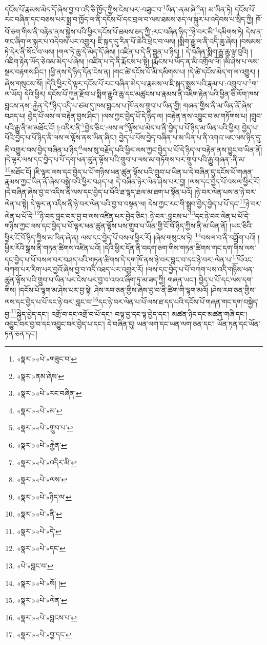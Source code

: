 དངོས་པོ་རྣམས་མེད་དོ་ཞེས་བྱ་བ་འདི་ཅི་ཁྱོད་ཀྱིས་ངེས་པར་:བཟུང་བ་\footnote{«སྣར་»«པེ་»གཟུང་བ་}ཡིན་:ནམ་ཞེ་\footnote{«སྣར་»ནམ་ཞེས་}ན། མ་ཡིན་ཏེ། དངོས་པོ་རང་བཞིན་དང་བཅས་པར་སྨྲ་བ་ཁྱོད་ལ་ནི་དངོས་པོ་དང་བྲལ་བ་ལས་ཐམས་ཅད་ལ་སྐུར་པ་འདེབས་པ་སྲིད་ཀྱི། ཁོ་བོ་ཅག་གིས་ནི་བརྟེན་ནས་སྐྱེས་པའི་ཕྱིར་དངོས་པོ་ཐམས་ཅད་ཀྱི་:རང་བཞིན་ཉིད་\footnote{«སྣར་»«པེ་»རང་བཞིན་}ཉེ་བར་མི་\footnote{«སྣར་»«པེ་»མ་}དམིགས་ཏེ། དེས་ན་གང་ཞིག་ལ་སྐུར་པ་འདེབས་པར་འགྱུར། ཇི་སྐད་དུ་རིན་པོ་ཆེའི་ཕྲེང་བ་ལས། །སྨིག་རྒྱུ་ལ་ནི་འདི་ཆུ་ཞེས། །བསམས་ཏེ་དེར་ནི་སོང་བ་ལས། །གལ་ཏེ་ཆུ་དེ་མེད་དོ་ཞེས། །འཛིན་པ་དེ་ནི་བླུན་པ་ཉིད། །
དེ་བཞིན་སྨིག་རྒྱུ་ཆུ་ལྟ་བུའི། །འཇིག་རྟེན་ཡོད་ཅེའམ་མེད་པ་ཞེས། །འཛིན་པ་དེ་ནི་རྨོངས་པ་སྟེ། །རྨོངས་པ་ཡོད་ན་མི་འགྲོལ་ལོ། །མི་ཤེས་པ་ལས་སྔར་བརྟགས་ཤིང་། །ཕྱི་ནས་དེ་ཉིད་དོན་ངེས་ན། །གང་ཚེ་དངོས་པོ་མི་དམིགས་པ། །དེ་ཚེ་དངོས་མེད་ག་ལ་འགྱུར། །ཞེས་གསུངས་སོ། །དེའི་ཕྱིར་དེ་ལྟར་དངོས་པོ་རང་བཞིན་མེད་པ་རྣམས་ལ་ཇི་སྐད་སྨྲས་པའི་རྣམ་པ་:འགྲུབ་པ་\footnote{«སྣར་»«པེ་»གྲུབ་པ་}ག་ལ་ཡོད། དེའི་ཕྱིར། དངོས་པོ་ཀུན་རྫོབ་པ་སྨིག་རྒྱུའི་ཆུ་དང་མཚུངས་པ་རྣམས་ནི་འཇིག་རྟེན་པའི་ཕྱིན་ཅི་ལོག་ཁས་བླངས་ནས་:རྐྱེན་དེ་\footnote{«སྣར་»«པེ་»རྐྱེན་}ཉིད་འདི་པ་ཙམ་དུ་ཁས་བླངས་པ་ཁོ་ནས་གྲུབ་པ་ཡིན་གྱི། གཞན་གྱིས་ནི་མ་ཡིན་ནོ་ཞེས་བཤད་པ། བྱེད་པོ་ལས་ལ་བརྟེན་བྱས་ཤིང་། །ལས་ཀྱང་བྱེད་པོ་དེ་ཉིད་ལ། །བརྟེན་ནས་འབྱུང་བ་མ་གཏོགས་པ། །གྲུབ་པའི་རྒྱུ་ནི་མ་མཐོང་ངོ། །:འདིར་ནི་\footnote{«སྣར་»«པེ་»འདིར་མི་}བྱེད་ཅིང་:ལས་ལ་\footnote{«སྣར་»«པེ་»ལས་}ལྟོས་པ་མེད་པ་ནི་བྱེད་པ་པོ་ཉིད་མ་ཡིན་པའི་ཕྱིར། བྱེད་པ་པོའི་བྱེད་པ་པོ་ཉིད་ནི་ལས་ལ་ལྟོས་ནས་ཡིན་ཞིང་། བྱེད་པ་པོས་བྱེད་བཞིན་པ་མ་ཡིན་པ་ནི་འགའ་ཡང་ལས་ཉིད་དུ་མི་འགྱུར་བས་བྱེད་བཞིན་པ་ཉིད་\footnote{«སྣར་»«པེ་»ཉིད་ལ་}ལས་སུ་བརྗོད་པའི་ཕྱིར་ལས་ཀྱང་བྱེད་པ་པོ་དེ་ཉིད་ལ་བརྟེན་ནས་བྱུང་བ་ཡིན་ནོ། །དེ་ལྟར་ལས་དང་བྱེད་པ་པོ་དག་ཕན་ཚུན་ལྟོས་པའི་གྲུབ་པ་ལས་མ་གཏོགས་པར་གྲུབ་པའི་རྒྱུ་གཞན་:ནི་མ་\footnote{«སྣར་»«པེ་»ནི་}མཐོང་ངོ། །ཇི་ལྟར་ལས་དང་བྱེད་པ་པོ་གཉིས་ཕན་ཚུན་ལྟོས་པའི་གྲུབ་པ་ཡིན་པ་དེ་བཞིན་དུ་དངོས་པོ་གཞན་རྣམས་ཀྱང་ཡིན་ནོ་ཞེས་བསྒྲེ་བའི་ཕྱིར་བཤད་པ། དེ་བཞིན་ཉེར་ལེན་ཤེས་པར་བྱ། །ལས་དང་བྱེད་པོ་བསལ་ཕྱིར་རོ། །དེ་བཞིན་ཞེས་བྱ་བ་འདིས་ནི་ལས་དང་བྱེད་པ་པོའི་ཐ་སྙད་ཐལ་མ་ཐག་པ་སྟོན་པའོ། །ཉེ་བར་ལེན་པས་ན་ཉེ་བར་ལེན་པ་སྟེ། དེ་ལྟར་ན་འདིས་ནི་ཉེ་བར་ལེན་པའི་བྱ་བ་བསྟན་ལ། དེས་ཀྱང་རང་གི་སྒྲུབ་བྱེད་བྱེད་པ་པོ་དང་\footnote{«སྣར་»«པེ་»དེ་}ཉེ་བར་ལེན་པ་པོ་དེ་\footnote{«སྣར་»«པེ་»དང་}ཉེ་བར་བླང་བར་བྱ་བ་ལས་འཛིན་པར་བྱེད་ཅིང་། ཉེ་བར་:བླངས་པ་\footnote{«པེ་»བླང་བ་}དང་ཉེ་བར་ལེན་པ་པོ་དེ་གཉིས་ཀྱང་ལས་དང་བྱེད་པ་པོ་ལྟར་ཕན་ཚུན་ལྟོས་པས་གྲུབ་པ་ཡིན་གྱི་ངོ་བོ་ཉིད་ཀྱིས་ནི་མ་ཡིན་ནོ། །ཡང་ཅིའི་ཕྱིར་ངོ་བོ་ཉིད་ཀྱིས་མ་ཡིན་ཞེ་ན། ལས་དང་བྱེད་པོ་བསལ་ཕྱིར་རོ། །ཞེས་གསུངས་ཏེ། \footnote{«སྣར་»«པེ་»སོ། ། }བསལ་བ་ནི་བཟློག་པའོ། །ཕྱིར་རོའི་སྒྲས་ནི་གཏན་ཚིགས་འཛིན་པའོ། །དེའི་ཕྱིར་དོན་ནི་བདག་ཅག་གིས་གཏན་ཚིགས་གང་དག་གིས་ལས་དང་བྱེད་པ་པོ་བསལ་བར་བཤད་པའི་གཏན་ཚིགས་དེ་དག་ཁོ་ནས་ཉེ་བར་བླང་བ་དང་ཉེ་བར་:ལེན་པ་\footnote{«སྣར་»«པེ་»ལེན་}པོའང་བཀག་པར་རིག་པར་བྱའོ་ཞེས་བྱ་བ་འདི་འཐད་པར་འགྱུར་རོ། །ལས་དང་བྱེད་པ་པོ་བཀག་པས་འདི་གཉིས་ཕན་ཚུན་ལྟོས་པའི་གྲུབ་པ་ཡིན་པར་ངེས་པར་བྱ་བ་འབའ་ཞིག་ཏུ་མ་ཟད་ཀྱི། གཞན་ཡང་། བྱེད་པ་པོ་དང་ལས་དག་གིས། །དངོས་པོ་ལྷག་མ་ཤེས་པར་བྱ་སྟེ། ཤེས་རབ་ཅན་གྱིས་ཞེས་བྱ་བ་ནི་ཚིག་གི་ལྷག་མའོ། །ཤེས་རབ་ཅན་གྱིས་ལས་དང་བྱེད་པ་པོ་དང་ཉེ་བར་:བླང་བ་\footnote{«སྣར་»«པེ་»བླངས་པ་}དང་ཉེ་བར་ལེན་པ་པོ་ལས་ཐ་དད་པའི་དངོས་པོ་གཞན་གང་དག་བསྐྱེད་བྱ་\footnote{«སྣར་»«པེ་»བྱ་དང་}སྐྱེད་བྱེད་དང་། འགྲོ་བ་དང་འགྲོ་བ་པོ་དང་། བལྟ་བྱ་དང་ལྟ་བྱེད་དང་། མཚན་ཉིད་དང་མཚན་གཞི་དང་། འབྱུང་བར་བྱ་བ་དང་འབྱུང་བར་བྱེད་པ་དང་། དེ་བཞིན་དུ། ཡན་ལག་དང་ཡན་ལག་ཅན་དང་། ཡོན་ཏན་དང་ཡོན་ཏན་ཅན་དང་། 